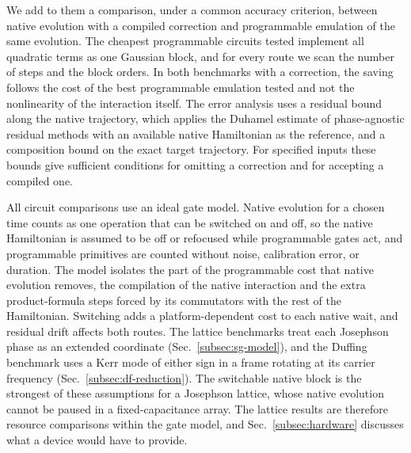 \documentclass[pra,twocolumn,superscriptaddress,nofootinbib,floatfix]{revtex4-2}
\theoremstyle{remark}
\newcommand{\revcolor}{\color{blue}}
\DeclareRobustCommand{\rev}[1]{{\revcolor #1}}
\begin{document}
\rev{We add to them a comparison, under a common accuracy criterion, between native evolution with a compiled correction and programmable emulation of the same evolution.} \rev{The cheapest programmable circuits tested implement all quadratic terms as one Gaussian block, and for every route we scan the number of steps and the block orders.} \rev{In both benchmarks with a correction, the saving follows the cost of the best programmable emulation tested and not the nonlinearity of the interaction itself.} \rev{The error analysis uses a residual bound along the native trajectory, which applies the Duhamel estimate of phase-agnostic residual methods \cite{Zoufal2023} with an available native Hamiltonian as the reference, and a composition bound on the exact target trajectory.} \rev{For specified inputs these bounds give sufficient conditions for omitting a correction and for accepting a compiled one.}

\rev{All circuit comparisons use an ideal gate model.} \rev{Native evolution for a chosen time counts as one operation that can be switched on and off, so the native Hamiltonian is assumed to be off or refocused while programmable gates act, and programmable primitives are counted without noise, calibration error, or duration.} \rev{The model isolates the part of the programmable cost that native evolution removes, the compilation of the native interaction and the extra product-formula steps forced by its commutators with the rest of the Hamiltonian.} \rev{Switching adds a platform-dependent cost to each native wait, and residual drift affects both routes.} \rev{The lattice benchmarks treat each Josephson phase as an extended coordinate (Sec.~\ref{subsec:sg-model}), and the Duffing benchmark uses a Kerr mode of either sign in a frame rotating at its carrier frequency (Sec.~\ref{subsec:df-reduction}).} \rev{The switchable native block is the strongest of these assumptions for a Josephson lattice, whose native evolution cannot be paused in a fixed-capacitance array.} \rev{The lattice results are therefore resource comparisons within the gate model, and Sec.~\ref{subsec:hardware} discusses what a device would have to provide.}
\end{document}
